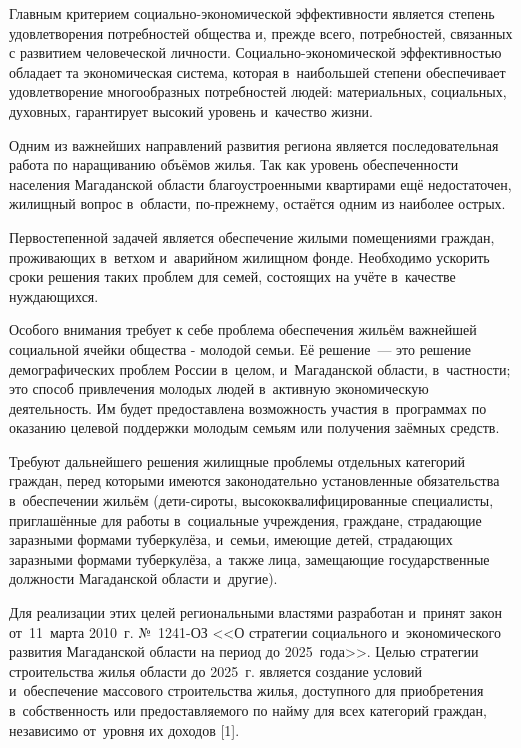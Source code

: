 



\makeProcTitle
{}

Главным критерием социально-экономической эффективности является степень удовлетворения потребностей общества и, прежде всего, потребностей, связанных с развитием человеческой личности. Социально-экономической эффективностью обладает та экономическая система, которая в~наибольшей степени обеспечивает удовлетворение многообразных потребностей людей: материальных, социальных, духовных, гарантирует высокий уровень и~качество жизни.

Одним из важнейших направлений развития региона является последовательная работа по наращиванию объёмов жилья. Так как уровень обеспеченности населения Магаданской области благоустроенными квартирами ещё недостаточен, жилищный вопрос в~области, по-прежнему, остаётся одним из наиболее острых.

Первостепенной задачей является обеспечение жилыми помещениями граждан, проживающих в~ветхом и~аварийном жилищном фонде. Необходимо ускорить сроки решения таких проблем для семей, состоящих на учёте в~качестве нуждающихся.

Особого внимания требует к себе проблема обеспечения жильём важнейшей социальной ячейки общества - молодой семьи. Её решение~--- это решение демографических проблем России в~целом, и~Магаданской области, в~частности; это способ привлечения молодых людей в~активную экономическую деятельность. Им будет предоставлена возможность участия в~программах по оказанию целевой поддержки молодым семьям или получения заёмных средств.

Требуют дальнейшего решения жилищные проблемы отдельных категорий граждан, перед которыми имеются законодательно установленные обязательства в~обеспечении жильём (дети-сироты, высококвалифицированные специалисты, приглашённые для работы в~социальные учреждения, граждане, страдающие заразными формами туберкулёза, и~семьи, имеющие детей, страдающих заразными формами туберкулёза, а~также лица, замещающие государственные должности Магаданской области и~другие).

Для реализации этих целей региональными властями разработан и~принят закон от~11~марта 2010~г. №~1241-ОЗ <<О стратегии социального и~экономического развития Магаданской области на период до 2025~года>>. Целью стратегии строительства жилья области до 2025~г. является создание условий и~обеспечение массового строительства жилья, доступного для приобретения в~собственность или предоставляемого по найму для всех категорий граждан, независимо от~уровня их доходов [1].

